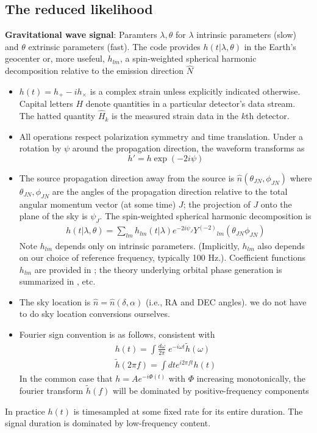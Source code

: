\documentclass[twocolumn,prd,nofootinbib]{revtex4}
\newcommand\Y[1]{Y^{(#1)}{}}
\begin{document}
\subsection{The reduced likelihood}
\noindent \textbf{Gravitational wave signal}: Paramters $\lambda,\theta$ for $\lambda$ intrinsic parameters (slow) and
$\theta$ extrinsic parameters (fast).  The code provides $h(t|\lambda,\theta)$ in the Earth's geocenter or, more
usefeul, $h_{lm}$, a spin-weighted spherical harmonic decomposition relative to the emission direction $\hat{N}$
\begin{shaded}
\begin{itemize}
\item $h(t)=h_+-i h_\times$ is a complex strain unless explicitly indicated otherwise.   Capital letters $H$ denote
  quantities in a particular detector's data stream.  The hatted quantity $\hat{H}_k$ is the measured strain data in the
  $k$th detector.
\item All operations respect polarization symmetry and time translation.  Under a rotation by $\psi$ around the
  propagation direction, the waveform transforms as
\[
h' = h \exp(-2i \psi)
\]
\item The source propagation direction away from the source is $\hat{n}(\theta_{JN},\phi_{JN})$ where
  $\theta_{JN},\phi_{JN}$ are the angles of the propagation direction relative to the total angular momentum vector (at
  some time) $J$; the projection of $J$
  onto the plane of the sky is $\psi_J$.  The spin-weighted
  spherical harmonic decomposition is 
\begin{eqnarray}
\label{eq:def:hSpinWeightEmissionDirection}
h(t|\lambda,\theta) = \sum_{lm} h_{lm}(t|\lambda) e^{-2i\psi_J}\Y{-2}_{lm}(\theta_{JN}\phi_{JN})
\end{eqnarray}
Note $h_{lm}$ depends only on intrinsic parameters.  (Implicitly, $h_{lm}$ also depends on our choice of reference
frequency, typically 100 Hz.).  Coefficient functions $h_{lm}$ are provided in
\cite{gw-astro-mergers-approximations-SpinningPNHigherHarmonics}; the theory underlying orbital phase generation is
summarized in  \cite{gw-astro-PN-Comparison-AlessandraSathya2009}, etc.
\item The sky location is $\hat{n}=\hat{n}(\delta,\alpha)$ (i.e., RA and DEC angles).  we do not have to do sky location
  conversions ourselves.
\item Fourier sign convention is as follows, consistent with \cite{gwastro-mergers-nr-Alignment-ROS-Polarization}
\begin{eqnarray}
h(t) = \int \frac{d \omega}{2\pi} \; e^{-i\omega t} \tilde{h}(\omega) \\
\tilde{h}(2\pi f) = \int dt e^{i 2\pi f t} h(t)
\end{eqnarray}
In the common case that  $h = Ae^{-i\Phi(t)}$ with $\Phi$ increasing monotonically, the fourier transform $\tilde{h}(f)$ will be dominated by
positive-frequency components
\end{itemize}
In practice $h(t)$ is timesampled at some fixed rate for its entire duration.  The signal duration is dominated by
low-frequency content.
\end{shaded}
\end{document}
